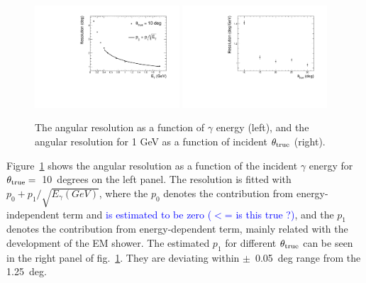 \documentclass[jkps,preprint,fleqn,showpacs,showkeys]{revtex4}
\begin{document}
\begin{figure}[!hbt]
\includegraphics[width=0.48\textwidth]{figures/Fig5_reco_graph.pdf}
\includegraphics[width=0.48\textwidth]{figures/Fig5_reco_inc.pdf}
\caption{ The angular resolution as a function of $\gamma$ energy (left), and the angular resolution for 1 GeV as a function of incident $\theta_{\rm{true}}$ (right). }
\label{fig:angle_reco_dep_gr}
\end{figure}

Figure~\ref{fig:angle_reco_dep_gr} shows the angular resolution as a function of the incident $\gamma$ energy for $\theta_{\rm{true}}=$~10~degrees on the left panel. The resolution is fitted with $p_{0} + p_{1}/\sqrt{E_{\gamma}(GeV)}$, where the $p_{0}$ denotes the contribution from energy-independent term and \textcolor{blue}{is estimated to be zero ($<$= is this true ?)}, and the $p_{1}$ denotes the contribution from energy-dependent term, mainly related with the development of the EM shower. The estimated $p_{1}$ for different $\theta_{\rm{true}}$ can be seen in the right panel of fig.~\ref{fig:angle_reco_dep_gr}. They are deviating within $\pm$~0.05~deg range from the 1.25~deg.
\end{document}

